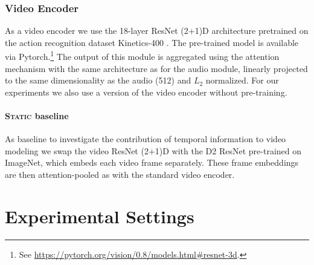 \subsubsection{Video Encoder}
As a video encoder we use the 18-layer ResNet (2+1)D architecture
\citep{tran2018closer} pretrained on the action recognition dataset
Kinetics-400 \citep{DBLP:journals/corr/KayCSZHVVGBNSZ17}. The
pre-trained model is available via Pytorch.\footnote{See
  \url{https://pytorch.org/vision/0.8/models.html\#resnet-3d}.}  The
output of this module is aggregated using the attention mechanism with
the same architecture as for the audio module, linearly projected to
the same dimensionality as the audio (512) and $L_2$ normalized.
For our experiments we also use a version of the video encoder
without pre-training.

\paragraph{\textsc{Static} baseline}
As baseline to investigate the contribution of temporal information to
video modeling we swap the video ResNet (2+1)D with the D2 ResNet
pre-trained on ImageNet, which embeds each video frame
separately. These frame embeddings are then attention-pooled as with
the standard video encoder. 


\section{Experimental Settings}
